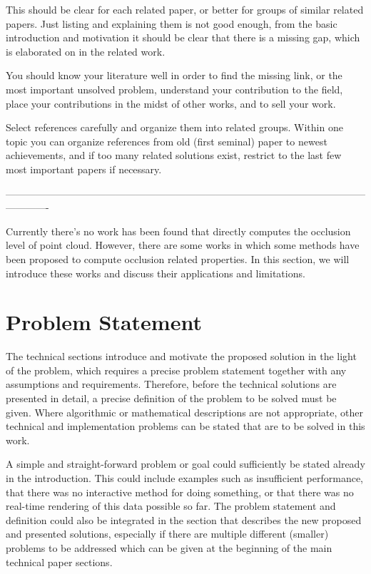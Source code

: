\documentclass[11pt, a4paper,oneside,chapterprefix=false]{scrbook}
\begin{document}
This should be clear for each related paper, or better for groups of similar related papers. Just listing and explaining them is not good enough, from the basic introduction and motivation it should be clear that there is a missing gap, which is elaborated on in the related work.

You should know your literature well in order to find the missing link, or the most important unsolved problem, understand your contribution to the field, place your contributions in the midst of other works, and to sell your work.

Select references carefully and organize them into related groups. Within one topic you can organize references from old (first seminal) paper to newest achievements, and if too many related solutions exist, restrict to the last few most important papers if necessary.

-------------------------------------------------------------------------------------------------------------------------

Currently there's no work has been found that directly computes the occlusion level of point cloud. However, there are some works in which some methods have been proposed to compute occlusion related properties. In this section, we will introduce these works and discuss their applications and limitations.

\chapter{Problem Statement} \label{chp:problem}

The technical sections introduce and motivate the proposed solution in the light of the problem, which requires a precise problem statement together with any assumptions and requirements. Therefore, before the technical solutions are presented in detail, a precise definition of the problem to be solved must be given. Where algorithmic or mathematical descriptions are not appropriate, other technical and implementation problems can be stated that are to be solved in this work.

A simple and straight-forward problem or goal could sufficiently be stated already in the introduction. This could include examples such as insufficient performance, that there was no interactive method for doing something, or that there was no real-time rendering of this data possible so far. The problem statement and definition could also be integrated in the section that describes the new proposed and presented solutions, especially if there are multiple different (smaller) problems to be addressed which can be given at the beginning of the main technical paper sections.
\end{document}
